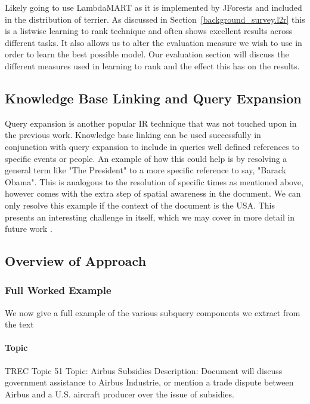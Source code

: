 \documentclass{mprop}
\begin{document}
Likely going to use LambdaMART as it is implemented by JForests and included in the distribution of terrier. As discussed in Section~\ref{background_survey.l2r} this is a listwise learning to rank technique and often shows excellent results across different tasks. It also allows us to alter the evaluation measure we wish to use in order to learn the best possible model. Our evaluation section will discuss the different measures used in learning to rank and the effect this has on the results.

\subsection{Knowledge Base Linking and Query Expansion}
Query expansion is another popular IR technique that was not touched upon in the previous work. Knowledge base linking can be used successfully in conjunction with query expansion to include in queries well defined references to specific events or people. An example of how this could help is by resolving a general term like "The President" to a more specific reference to say, "Barack Obama". This is analogous to the resolution of specific times as mentioned above, however comes with the extra step of spatial awareness in the document. We can only resolve this example if the context of the document is the USA. This presents an interesting challenge in itself, which we may cover in more detail in future work .

\subsection{Overview of Approach}

\subsubsection{Full Worked Example}
We now give a full example of the various subquery components we extract from the text

\paragraph{Topic}
TREC Topic 51
Topic: Airbus Subsidies
Description: Document will discuss government assistance to Airbus Industrie, or mention a
trade dispute between Airbus and a U.S. aircraft producer over the issue of
subsidies. 
\end{document}
